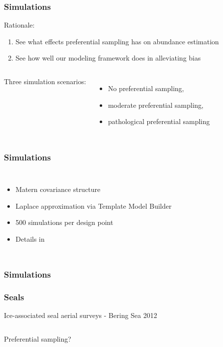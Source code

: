 \documentclass[serif,mathserif]{beamer}
\begin{document}
\begin{frame}
\frametitle{Simulations}
  \textcolor{noaaturq}{Rationale}:
  \begin{enumerate}
  \item See what effects preferential sampling
  has on abundance estimation
  \item See how well our modeling framework does in alleviating bias
  \end{enumerate} \pause
  \begin{columns}[c]
\column{2in}
  Three simulation scenarios:
  \begin{itemize}
    \item No preferential sampling,
    \item moderate preferential sampling,
    \item pathological preferential sampling
   \pause
   \end{itemize}\column{2in}
\end{columns}
\end{frame}

\begin{frame}
\frametitle{Simulations}
  \begin{columns}[c]
\column{1.5in}
\begin{itemize}
\item Matern covariance structure
\item Laplace approximation via Template Model Builder \citep{KristensenEtAl2016}
\item 500 simulations per design point
\item Details in \cite{ConnEtAl2017}
\end{itemize}
\column{2.8in}
\end{columns}
\end{frame}


\begin{frame}
\frametitle{Simulations}
\end{frame}




\begin{frame}
\frametitle{Seals}
Ice-associated seal aerial surveys - Bering Sea 2012
\begin{columns}[c]
\column{2in}
 \pause
\column{2in}
 \pause
\end{columns}
\vspace{.25in}
 \textcolor{noaaturq}{Preferential sampling?}
\end{frame}
\end{document}
